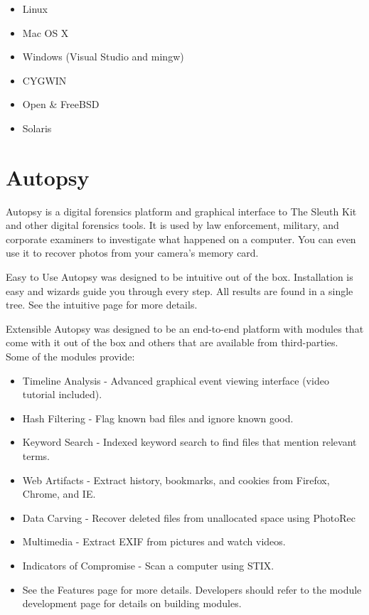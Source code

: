 \begin{itemize}
\item Linux
\item Mac OS X
\item Windows (Visual Studio and mingw)
\item CYGWIN
\item Open \& FreeBSD
\item Solaris
\end{itemize}

\section{Autopsy}

Autopsy is a digital forensics platform and graphical interface to The Sleuth Kit
and other digital forensics tools. It is used by law enforcement, military, 
and corporate examiners to investigate what happened on a computer. You can even 
use it to recover photos from your camera's memory card.

Easy to Use
Autopsy was designed to be intuitive out of the box. Installation is easy and
wizards guide you through every step. All results are found in a single tree.
See the intuitive page for more details.

Extensible
Autopsy was designed to be an end-to-end platform with modules that come with
it out of the box and others that are available from third-parties. Some of the
modules provide:

\begin{itemize}
\item Timeline Analysis - Advanced graphical event viewing interface (video 
tutorial included).
\item Hash Filtering - Flag known bad files and ignore known good.
\item Keyword Search - Indexed keyword search to find files that mention relevant
terms.
\item Web Artifacts - Extract history, bookmarks, and cookies from Firefox, Chrome,
and IE.
\item Data Carving - Recover deleted files from unallocated space using PhotoRec
\item Multimedia - Extract EXIF from pictures and watch videos.
\item Indicators of Compromise - Scan a computer using STIX.
\item See the Features page for more details. Developers should refer to the
module development page for details on building modules.
\end{itemize}

